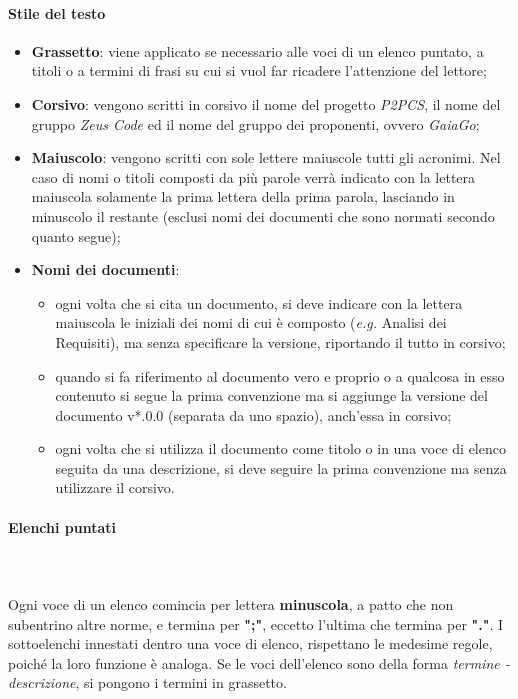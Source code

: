 		\paragraph{Stile del testo}
		\begin{itemize}
			\item \textbf{Grassetto}:
			viene applicato se necessario alle voci di un elenco puntato, a titoli o a termini di frasi su cui si vuol far ricadere l'attenzione del lettore;
			\item \textbf{Corsivo}: vengono scritti in corsivo il nome del progetto \textit{P2PCS}, il nome del gruppo \textit{Zeus Code} ed il nome del gruppo dei proponenti, ovvero \textit{GaiaGo}; %
			\item \textbf{Maiuscolo}: vengono scritti con sole lettere maiuscole tutti gli acronimi. Nel caso di nomi o titoli composti da più parole verrà indicato con la lettera maiuscola solamente la prima lettera della prima parola, lasciando in minuscolo il restante (esclusi nomi dei documenti che sono normati secondo quanto segue);
			\item \textbf{Nomi dei documenti}:
			\begin{itemize}
				\item ogni volta che si cita un documento, si deve indicare con la lettera maiuscola le iniziali dei nomi di cui è composto (\textit{e.g.} Analisi dei Requisiti), ma senza specificare la versione, riportando il tutto in corsivo;
				\item quando si fa riferimento al documento vero e proprio o a qualcosa in esso contenuto si segue la prima convenzione ma si aggiunge la versione del documento v*.0.0 (separata da uno spazio), anch'essa in corsivo;
				\item ogni volta che si utilizza il documento come titolo o in una voce di elenco seguita da una descrizione, si deve seguire la prima convenzione ma senza utilizzare il corsivo.
			\end{itemize}
		\end{itemize}
		\paragraph{Elenchi puntati} \mbox{}\\ \mbox{}\\
		Ogni voce di un elenco comincia per lettera \textbf{minuscola}, a patto che non subentrino altre norme, e termina per \textbf{";"}, eccetto l'ultima che termina per \textbf{"."}. I sottoelenchi innestati dentro una voce di elenco, rispettano le medesime regole, poiché la loro funzione è analoga.\newline
		Se le voci dell'elenco sono della forma \textit{termine - descrizione}, si pongono i termini in grassetto.
